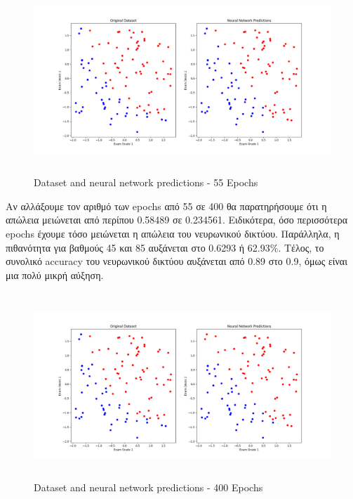 \documentclass{article}
\begin{document}
	\pagebreak
	\begin{figure}[h!]
		\centering
		\includegraphics[height=7cm,width=\linewidth]{../exercise3_2/python/images/dataset_ANN_predictions.png}
		\caption{Dataset and neural network predictions - 55 Epochs}
	\end{figure}
	
	\noindent
	Αν αλλάξουμε τον αριθμό των epochs από 55 σε 400 θα παρατηρήσουμε ότι η απώλεια μειώνεται από περίπου 0.58489 σε 0.234561. Eιδικότερα, όσο περισσότερα epochs έχουμε τόσο μειώνεται η απώλεια του νευρωνικού δικτύου. Παράλληλα, η πιθανότητα για βαθμούς 45 και 85 αυξάνεται στο 0.6293 ή 62.93\%. Tἐλος, το συνολικό accuracy του νευρωνικού δικτύου αυξάνεται από 0.89 στο 0.9, όμως είναι μια πολύ μικρή αύξηση.
	
	\begin{figure}[h!]
		\centering
		\includegraphics[height=7cm,width=\linewidth]{../exercise3_2/python/images/dataset_ANN_predictions_400_epochs.png}
		\caption{Dataset and neural network predictions - 400 Epochs}
	\end{figure}
\pagebreak
\end{document}
